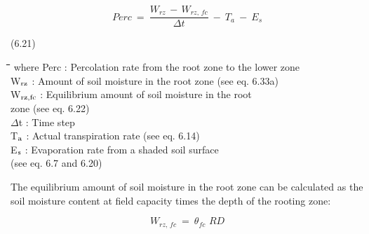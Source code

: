 \documentclass[11pt]{article}
\begin{document}
\begin{displaymath}
Perc  ~=~{\frac{W _{rz} \, -\, W _{rz,\, fc} }{\Delta t}} ~-~ T _{a} ~-~ E _{s} 
\end{displaymath}

 \bigskip
\strut\hfill (6.21)

\nwln
\begin{tabbing}
\hspace{1.27cm}\=\hspace{1.27cm}\=\hspace{1.27cm}\=\hspace{1.27cm}\=%
\hspace{1.27cm}\=\hspace{1.27cm}\=\hspace{1.27cm}\=\hspace{1.27cm}\=%
\hspace{1.27cm}\=\hspace{1.27cm}\=\kill
where\> Perc\> : Percolation rate from the root zone to the lower zone\> \> \> \> \> \> \> \> [cm d$^{{\rm -1}}$]\\
\>W$_{{\rm rz}}$\> : Amount of soil moisture in the root zone (see eq. 6.33a)\> \> \> \> \> \> \> \> [cm]\\
\>W$_{{\rm rz,fc}}$\> : Equilibrium amount of soil moisture in the root\\
\>\>   zone (see eq. 6.22)\> \> \> \> \> \> \> \> [cm]\\
\>$\Delta$t\> : Time step\> \> \> \> \> \> \> \> [d]\\
\>T$_{{\rm a}}$\> : Actual transpiration rate (see eq. 6.14)\> \> \> \> \> \> \> \> [cm d$^{{\rm -1}}$]\\
\>E$_{{\rm s}}$\> : Evaporation rate from a shaded soil surface \\
\>\>  (see eq. 6.7  and 6.20)\> \> \> \> \> \> \> \> [cm d$^{{\rm -1}}$]
\end{tabbing}
 The equilibrium amount of soil moisture in the root zone can be calculated as the soil
moisture content at field capacity times the depth of the rooting zone:

\begin{displaymath}
W _{rz,\, fc} ~=~ \theta  _{fc} \,\, RD
\end{displaymath}
\end{document}
